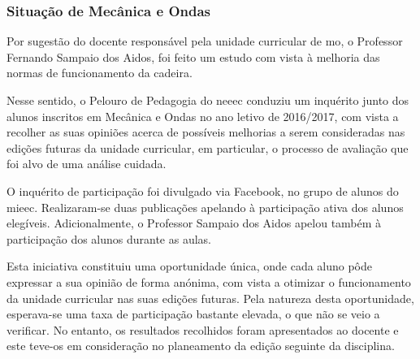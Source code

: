 
\subsubsection{Situação de Mecânica e Ondas}

Por sugestão do docente responsável pela unidade curricular de \acrfull{mo}, o Professor Fernando Sampaio dos Aidos, foi feito um estudo com vista à melhoria das normas de funcionamento da cadeira.

Nesse sentido, o Pelouro de Pedagogia do \acrshort{neeec} conduziu um inquérito junto dos alunos inscritos em Mecânica e Ondas no ano letivo de 2016/2017, com vista a recolher as suas opiniões acerca de possíveis melhorias a serem consideradas nas edições futuras da unidade curricular, em particular, o processo de avaliação que foi alvo de uma análise cuidada.

O inquérito de participação foi divulgado via Facebook, no grupo de alunos do \acrshort{mieec}. Realizaram-se duas publicações apelando à participação ativa dos alunos elegíveis. Adicionalmente, o Professor Sampaio dos Aidos apelou também à participação dos alunos durante as aulas.

Esta iniciativa constituiu uma oportunidade única, onde cada aluno pôde expressar a sua opinião de forma anónima, com vista a otimizar o funcionamento da unidade curricular nas suas edições futuras. Pela natureza desta oportunidade, esperava-se uma taxa de participação bastante elevada, o que não se veio a verificar. No entanto, os resultados recolhidos foram apresentados ao docente e este teve-os em consideração no planeamento da edição seguinte da disciplina.
